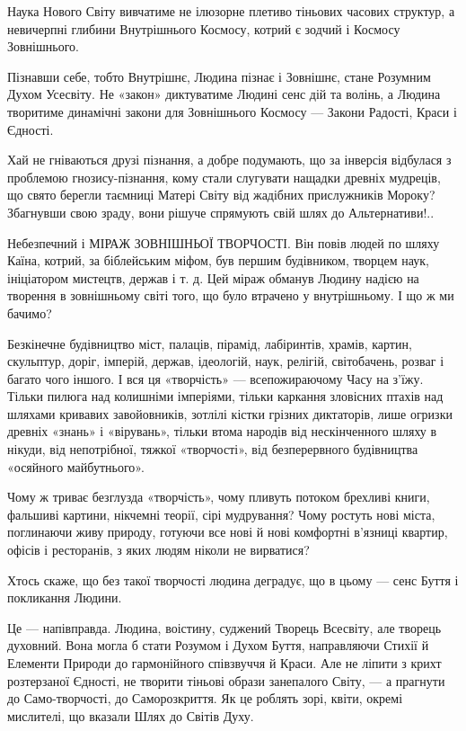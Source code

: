 Наука Нового Світу вивчатиме не ілюзорне плетиво тіньових часових структур, а
невичерпні глибини Внутрішнього Космосу, котрий є зодчий і Космосу Зовнішнього.

Пізнавши себе, тобто Внутрішнє, Людина пізнає і Зовнішнє, стане Розумним Духом
Усесвіту. Не «закон» диктуватиме Людині сенс дій та волінь, а Людина творитиме
динамічні закони для Зовнішнього Космосу — Закони Радості, Краси і Єдності.

Хай не гніваються друзі пізнання, а добре подумають, що за інверсія відбулася з
проблемою гнозису-пізнання, кому стали слугувати нащадки древніх мудреців, що
свято берегли таємниці Матері Світу від жадібних прислужників Мороку? Збагнувши
свою зраду, вони рішуче спрямують свій шлях до Альтернативи!..

Небезпечний і МІРАЖ ЗОВНІШНЬОЇ ТВОРЧОСТІ. Він повів людей по шляху Каїна,
котрий, за біблейським міфом, був першим будівником, творцем наук, ініціатором
мистецтв, держав і т. д. Цей міраж обманув Людину надією на творення в
зовнішньому світі того, що було втрачено у внутрішньому. І що ж ми бачимо?

Безкінечне будівництво міст, палаців, пірамід, лабіринтів, храмів, картин,
скульптур, доріг, імперій, держав, ідеологій, наук, релігій, світобачень,
розваг і багато чого іншого. І вся ця «творчість» — всепожираючому Часу на
з’їжу. Тільки пилюга над колишніми імперіями, тільки каркання зловісних птахів
над шляхами кривавих завойовників, зотлілі кістки грізних диктаторів, лише
огризки древніх «знань» і «вірувань», тільки втома народів від нескінченного
шляху в нікуди, від непотрібної, тяжкої «творчості», від безперервного
будівництва «осяйного майбутнього».

Чому ж триває безглузда «творчість», чому пливуть потоком брехливі книги,
фальшиві картини, нікчемні теорії, сірі мудрування? Чому ростуть нові міста,
поглинаючи живу природу, готуючи все нові й нові комфортні в’язниці квартир,
офісів і ресторанів, з яких людям ніколи не вирватися?

Хтось скаже, що без такої творчості людина деградує, що в цьому — сенс Буття і
покликання Людини.

Це — напівправда. Людина, воістину, суджений Творець Всесвіту, але творець
духовний. Вона могла б стати Розумом і Духом Буття, направляючи Стихії й
Елементи Природи до гармонійного співзвуччя й Краси. Але не ліпити з крихт
розтерзаної Єдності, не творити тіньові образи занепалого Світу, — а прагнути
до Само-творчості, до Саморозкриття. Як це роблять зорі, квіти, окремі
мислителі, що вказали Шлях до Світів Духу.

